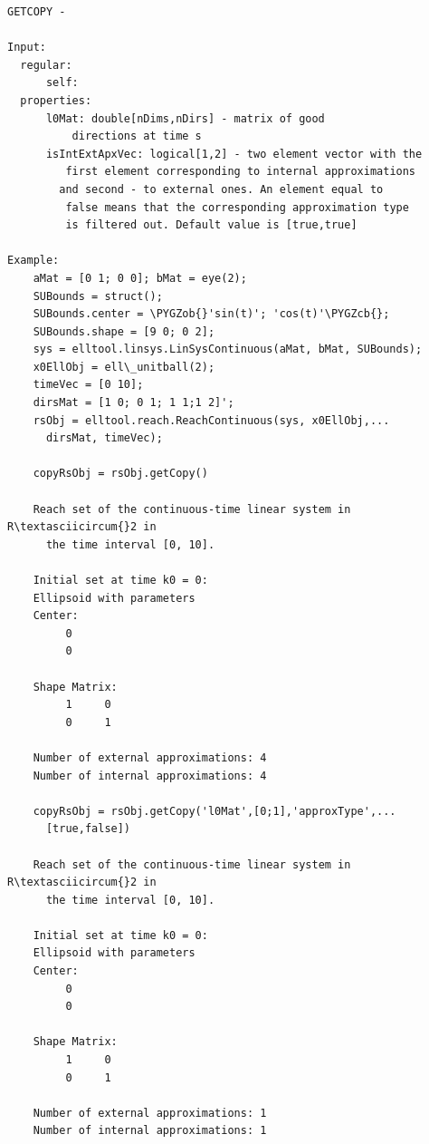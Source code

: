 \documentclass[letterpaper,10pt,english]{sphinxmanual}
\def\PYGZob{\char`\{}
\def\PYGZcb{\char`\}}
\begin{document}
\begin{Verbatim}[commandchars=\\\{\}]
GETCOPY -

Input:
  regular:
      self:
  properties:
      l0Mat: double[nDims,nDirs] - matrix of good
          directions at time s
      isIntExtApxVec: logical[1,2] - two element vector with the
         first element corresponding to internal approximations
        and second - to external ones. An element equal to
         false means that the corresponding approximation type
         is filtered out. Default value is [true,true]

Example:
    aMat = [0 1; 0 0]; bMat = eye(2);
    SUBounds = struct();
    SUBounds.center = \PYGZob{}'sin(t)'; 'cos(t)'\PYGZcb{};
    SUBounds.shape = [9 0; 0 2];
    sys = elltool.linsys.LinSysContinuous(aMat, bMat, SUBounds);
    x0EllObj = ell\_unitball(2);
    timeVec = [0 10];
    dirsMat = [1 0; 0 1; 1 1;1 2]';
    rsObj = elltool.reach.ReachContinuous(sys, x0EllObj,...
      dirsMat, timeVec);

    copyRsObj = rsObj.getCopy()

    Reach set of the continuous-time linear system in R\textasciicircum{}2 in
      the time interval [0, 10].

    Initial set at time k0 = 0:
    Ellipsoid with parameters
    Center:
         0
         0

    Shape Matrix:
         1     0
         0     1

    Number of external approximations: 4
    Number of internal approximations: 4

    copyRsObj = rsObj.getCopy('l0Mat',[0;1],'approxType',...
      [true,false])

    Reach set of the continuous-time linear system in R\textasciicircum{}2 in
      the time interval [0, 10].

    Initial set at time k0 = 0:
    Ellipsoid with parameters
    Center:
         0
         0

    Shape Matrix:
         1     0
         0     1

    Number of external approximations: 1
    Number of internal approximations: 1
\end{Verbatim}
\label{chap_func:elltool-reach-areach-geteascalefactor}
\end{document}
